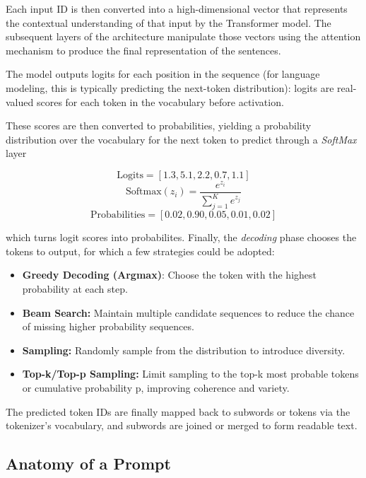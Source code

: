 Each input ID is then converted into a high-dimensional vector that represents the contextual understanding of that input by the Transformer model. The subsequent layers of the architecture manipulate those vectors using the attention mechanism to produce the final representation of the sentences. \cite{vaswani2017attention}

The model outputs logits for each position in the sequence (for language modeling, this is typically predicting the next-token distribution): logits are real-valued scores for each token in the vocabulary before activation.

These scores are then converted to probabilities, yielding a probability distribution over the vocabulary for the next token to predict through a \textit{SoftMax} layer

\[
\text{Logits} = [1.3, 5.1, 2.2, 0.7, 1.1]
\]
\[
\text{Softmax}(z_i) = \frac{e^{z_i}}{\sum_{j=1}^{K} e^{z_j}}
\]
\[
\text{Probabilities} = [0.02, 0.90, 0.05, 0.01, 0.02]
\]

which turns logit scores into probabilites.
Finally, the \textit{decoding} phase chooses the tokens to output, for which a few strategies could be adopted: \cite{radford2018improving}

\begin{itemize}
    \item \textbf{Greedy Decoding (Argmax)}: Choose the token with the highest probability at each step.
    \item \textbf{Beam Search:} Maintain multiple candidate sequences to reduce the chance of missing higher probability sequences.
    \item \textbf{Sampling:} Randomly sample from the distribution to introduce diversity.
    \item \textbf{Top-k/Top-p Sampling:} Limit sampling to the top-k most probable tokens or cumulative probability p, improving coherence and variety.
\end{itemize}

The predicted token IDs are finally mapped back to subwords or tokens via the tokenizer's vocabulary, and subwords are joined or merged to form readable text.





\subsection{Anatomy of a Prompt}
\label{sec:prompt-anatomy}

